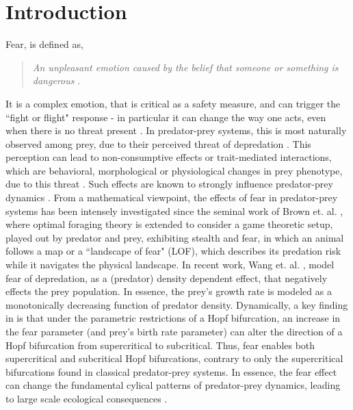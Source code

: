 \documentclass[10pt]{amsart}
\theoremstyle{definition}
\begin{document}



\section{Introduction}

Fear, is defined as,
 
\begin{quotation}
\emph{An unpleasant emotion caused by the belief that someone or something is dangerous} \cite{mer02}. 
\end{quotation}

It is a complex emotion, that is critical as a safety measure, and can trigger the ``fight or flight" response \cite{Brac04} - in particular it can change the way one acts, even when there is no threat present \cite{Cress11}. In predator-prey systems, this is most naturally observed among prey, due to their perceived threat of depredation \cite{Sher20}. This perception can lead to non-consumptive effects or trait-mediated interactions, which are behavioral, morphological or physiological changes in prey phenotype, due to this threat \cite{Peac13, Sher20}. Such effects are known to strongly influence predator-prey dynamics \cite{Peck08}. 
From a mathematical viewpoint, the effects of fear in predator-prey systems has been intensely investigated since the seminal work of Brown et. al. \cite{Brown99}, where optimal foraging theory is extended to consider a game theoretic setup, played out by predator and prey, exhibiting stealth and fear, in which an animal follows a map or a ``landscape of fear" (LOF), which describes its predation risk while it navigates the physical landscape. In recent work, Wang et. al. \cite{Wang16}, model fear of depredation, as a (predator) density dependent effect, that negatively effects the prey population. In essence, the prey's growth rate is modeled as a monotonically decreasing function of predator density. Dynamically, a key finding in \cite{Wang16} is that under the parametric restrictions of a Hopf bifurcation, an increase in the fear parameter (and prey's birth rate parameter) can alter the direction of a Hopf bifurcation from supercritical to subcritical. Thus, fear enables both supercritical and subcritical Hopf bifurcations, contrary to only the supercritical bifurcations found in classical predator-prey systems. In essence, the fear effect can change the fundamental cylical patterns of predator-prey dynamics, leading to large scale ecological consequences \cite{Ab00}. 
\end{document}
